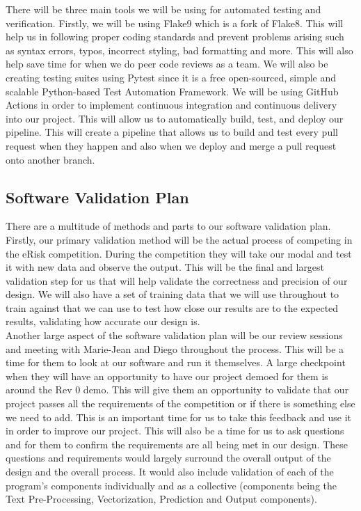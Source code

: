 \documentclass[12pt, titlepage]{article}
\begin{document}
  There will be three main tools we will be using for automated testing and verification. Firstly, we will be using Flake9 which is a fork of Flake8. This will help us in following proper coding standards and prevent problems arising such as syntax errors, typos, incorrect styling, bad formatting and more. This will also help save time for when we do peer code reviews as a team. We will also be creating testing suites using Pytest since it is a free open-sourced, simple and scalable Python-based Test Automation Framework. We will be using GitHub Actions in order to implement continuous integration and continuous delivery into our project. This will allow us to automatically build, test, and deploy our pipeline. This will create a pipeline that allows us to build and test every pull request when they happen and also when we deploy and merge a pull request onto another branch.
  
  \subsection{Software Validation Plan}
  
  There are a multitude of methods and parts to our software validation plan. Firstly, our primary validation method will be the actual process of competing in the eRisk competition. During the competition they will take our modal and test it with new data and observe the output. This will be the final and largest validation step for us that will help validate the correctness and precision of our design. We will also have a set of training data that we will use throughout to train against that we can use to test how close our results are to the expected results, validating how accurate our design is. \\
  
  Another large aspect of the software validation plan will be our review sessions and meeting with Marie-Jean and Diego throughout the process. This will be a time for them to look at our software and run it themselves. A large checkpoint when they will have an opportunity to have our project demoed for them is around the Rev 0 demo. This will give them an opportunity to validate that our project passes all the requirements of the competition or if there is something else we need to add. This is an important time for us to take this feedback and use it in order to improve our project. This will also be a time for us to ask questions and for them to confirm the requirements are all being met in our design. These questions and requirements would largely surround the overall output of the design and the overall process. It would also include validation of each of the program's components individually and as a collective (components being the Text Pre-Processing, Vectorization, Prediction and Output components). \\
  
\end{document}
